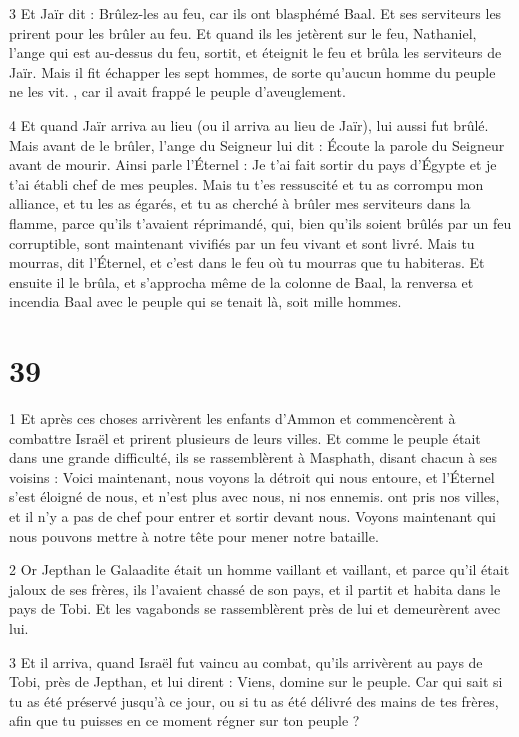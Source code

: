 \par 3 Et Jaïr dit : Brûlez-les au feu, car ils ont blasphémé Baal. Et ses serviteurs les prirent pour les brûler au feu. Et quand ils les jetèrent sur le feu, Nathaniel, l'ange qui est au-dessus du feu, sortit, et éteignit le feu et brûla les serviteurs de Jaïr. Mais il fit échapper les sept hommes, de sorte qu'aucun homme du peuple ne les vit. , car il avait frappé le peuple d'aveuglement.

\par 4 Et quand Jaïr arriva au lieu (ou il arriva au lieu de Jaïr), lui aussi fut brûlé. Mais avant de le brûler, l'ange du Seigneur lui dit : Écoute la parole du Seigneur avant de mourir. Ainsi parle l'Éternel : Je t'ai fait sortir du pays d'Égypte et je t'ai établi chef de mes peuples. Mais tu t'es ressuscité et tu as corrompu mon alliance, et tu les as égarés, et tu as cherché à brûler mes serviteurs dans la flamme, parce qu'ils t'avaient réprimandé, qui, bien qu'ils soient brûlés par un feu corruptible, sont maintenant vivifiés par un feu vivant et sont livré. Mais tu mourras, dit l'Éternel, et c'est dans le feu où tu mourras que tu habiteras. Et ensuite il le brûla, et s'approcha même de la colonne de Baal, la renversa et incendia Baal avec le peuple qui se tenait là, soit mille hommes.

\chapter{39}

\par 1 Et après ces choses arrivèrent les enfants d'Ammon et commencèrent à combattre Israël et prirent plusieurs de leurs villes. Et comme le peuple était dans une grande difficulté, ils se rassemblèrent à Masphath, disant chacun à ses voisins : Voici maintenant, nous voyons la détroit qui nous entoure, et l'Éternel s'est éloigné de nous, et n'est plus avec nous, ni nos ennemis. ont pris nos villes, et il n'y a pas de chef pour entrer et sortir devant nous. Voyons maintenant qui nous pouvons mettre à notre tête pour mener notre bataille.

\par 2 Or Jepthan le Galaadite était un homme vaillant et vaillant, et parce qu'il était jaloux de ses frères, ils l'avaient chassé de son pays, et il partit et habita dans le pays de Tobi. Et les vagabonds se rassemblèrent près de lui et demeurèrent avec lui.

\par 3 Et il arriva, quand Israël fut vaincu au combat, qu'ils arrivèrent au pays de Tobi, près de Jepthan, et lui dirent : Viens, domine sur le peuple. Car qui sait si tu as été préservé jusqu'à ce jour, ou si tu as été délivré des mains de tes frères, afin que tu puisses en ce moment régner sur ton peuple ?

